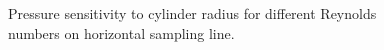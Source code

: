 \documentclass[12pt]{aiaa-pretty}
\begin{document}
\begin{figure}[H]
	\quad
	\caption{Pressure sensitivity to cylinder radius for different Reynolds numbers on horizontal sampling line.}
	\label{fig:cylinderPressureSensitivity}
\end{figure}
%
\end{document}
